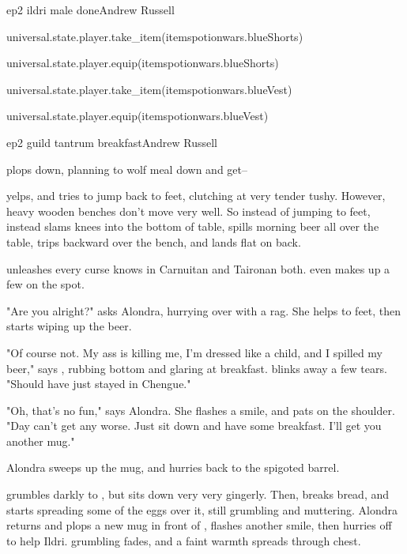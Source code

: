 \documentclass{book}
\begin{document}
\begin{childnode}{ep2 ildri male done}{Andrew Russell}
    \begin{code}

        universal.state.player.take\_item(itemspotionwars.blueShorts)

        universal.state.player.equip(itemspotionwars.blueShorts)

        universal.state.player.take\_item(itemspotionwars.blueVest)

        universal.state.player.equip(itemspotionwars.blueVest)

    \end{code}


\end{childnode}

\begin{childnode}{ep2 guild tantrum breakfast}{Andrew Russell}


    \name{} plops down, planning to wolf \hisher{} meal down and get--

    \HeShe{} yelps, and tries to jump back to \hisher{} feet, clutching at \hisher{} very tender tushy. However, heavy wooden benches don't move very well. So instead of jumping to \hisher{} feet, \name{} instead slams \hisher{} knees into the bottom of \hisher{} 
    table, 
    spills \hisher{} morning beer all over the table, trips backward over the bench, and lands flat on \hisher{} back.

    \name{} unleashes every curse \heshe{} knows in Carnuitan and Taironan both. \HeShe{} even makes up a few on the spot.

    "Are you alright?" asks Alondra, hurrying over with a rag. She helps \name{} to \hisher{} feet, then starts wiping up the beer.

    "Of course not. My ass is killing me, I'm dressed like a child, and I spilled my beer," says \name{}, rubbing \hisher{} bottom and glaring at \hisher{} breakfast. \HeShe{} blinks away a few tears. "Should have just stayed in Chengue."

    "Oh, that's no fun," says Alondra. She flashes \name{} a smile, and pats \himher{} on the shoulder. "Day can't get any worse. Just sit down and have some breakfast. I'll get you another mug."

    Alondra sweeps up the mug, and hurries back to the spigoted barrel.

    \name{} grumbles darkly to \himselfherself{}, but sits down very very gingerly. Then, \heshe{} breaks \hisher{} bread, and starts spreading some of the eggs over it, still grumbling and muttering. Alondra returns and plops a new mug in front of \name{}, 
    flashes \himher{} another smile, then hurries off to help Ildri. \names{} grumbling fades, and a faint warmth spreads through \hisher{} chest.


\end{childnode}
\end{document}
